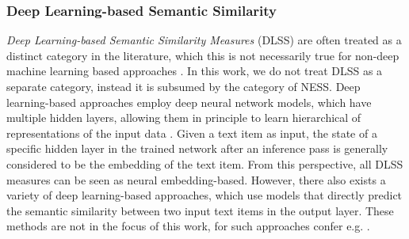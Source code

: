 \documentclass[11pt]{scrreprt}
\let\citef\cite  %
\let\cite\parencite  %
\begin{document}
\subsubsection{Deep Learning-based Semantic Similarity}
\textit{Deep Learning-based Semantic Similarity Measures} (DLSS) are often treated as a distinct category in the literature, which this is not necessarily true for non-deep machine learning based approaches \cite{harispeSemanticSimilarityNatural2015, chandrasekaranEvolutionSemanticSimilarity2021, hanSurveyTechniquesApplications2021, zadSurveyDeepLearning2021}. In this work, we do not treat DLSS as a separate category, instead it is subsumed by the category of NESS. Deep learning-based approaches employ deep neural network models, which have multiple hidden layers, allowing them in principle to learn hierarchical of representations of the input data \cite{goodfellowDeepLearning2016}. Given a text item as input, the state of a specific hidden layer in the trained network after an inference pass is generally considered to be the embedding of the text item. From this perspective, all DLSS measures can be seen as neural embedding-based. However, there also exists a variety of deep learning-based approaches, which use models that directly predict the semantic similarity between two input text items in the output layer. These methods are not in the focus of this work, for such approaches confer e.g. \citef{taiImprovedSemanticRepresentations2015, hePairwiseWordInteraction2016, shaoHCTISemEval2017Task2017, tianECNUSemEval2017Task2017, wangSentenceSimilarityLearning2017, lopez-gazpioWordNgramAttention2019, tienSentenceModelingMultiple2019, tienSentenceModelingMultiple2019a, zhengDetectionMedicalText2019}.



%
%
%
\end{document}
